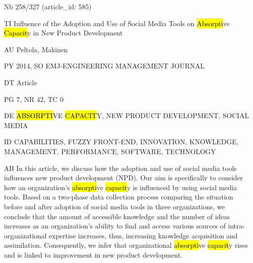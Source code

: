 \documentclass[a4paper]{article}
\begin{document}
\vspace*{-2cm}
Nb \tabto{0cm}258/327 (article\_id: 585)\par
TI \tabto{0cm}Influence of the Adoption and Use of Social Media Tools on \hl{Absorpti}ve \hl{Capacit}y in New Product Development\par
AU \tabto{0cm}Peltola, Makinen\par
PY \tabto{0cm}2014, SO EMJ-ENGINEERING MANAGEMENT JOURNAL\par
DT \tabto{0cm}Article\par
PG \tabto{0cm}7, NR 42, TC 0\par
DE \tabto{0cm}\hl{ABSORPTI}VE \hl{CAPACIT}Y, NEW PRODUCT DEVELOPMENT, SOCIAL MEDIA\par
ID \tabto{0cm}CAPABILITIES, FUZZY FRONT-END, INNOVATION, KNOWLEDGE, MANAGEMENT, PERFORMANCE, SOFTWARE, TECHNOLOGY\par
AB \tabto{0cm}In this article, we discuss how the adoption and use of social media tools influences new product development (NPD). Our aim is specifically to consider how an organization's \hl{absorpti}ve \hl{capacit}y is influenced by using social media tools. Based on a two-phase data collection process comparing the situation before and after adoption of social media tools in three organizations, we conclude that the amount of accessible knowledge and the number of ideas increases as an organization's ability to find and access various sources of intra-organizational expertise increases, thus, increasing knowledge acquisition and assimilation. Consequently, we infer that organizational \hl{absorpti}ve \hl{capacit}y rises and is linked to improvement in new product development.\par
\clearpage
\end{document}
